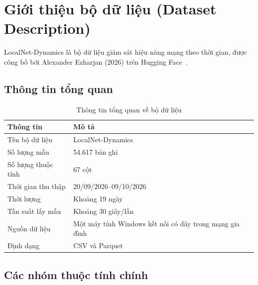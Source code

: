 \section{Giới thiệu bộ dữ liệu (Dataset Description)}

LocalNet-Dynamics là bộ dữ liệu giám sát hiệu năng mạng theo thời gian, được công bố bởi Alexander Ezharjan (2026) trên Hugging Face~\cite{localnet2026}.

\subsection{Thông tin tổng quan}

\begin{table}[H]
    \centering
    \caption{Thông tin tổng quan về bộ dữ liệu}
    \begin{tabular}{p{} p{}}
        \toprule
        \textbf{Thông tin} & \textbf{Mô tả} \\
        \midrule
        Tên bộ dữ liệu & LocalNet-Dynamics \\
        Số lượng mẫu & 54.617 bản ghi \\
        Số lượng thuộc tính & 67 cột \\
        Thời gian thu thập & 20/09/2026--09/10/2026 \\
        Thời lượng & Khoảng 19 ngày \\
        Tần suất lấy mẫu & Khoảng 30 giây/lần \\
        Nguồn dữ liệu &
        Một máy tính Windows kết nối có dây
        trong mạng gia đình \\
        Định dạng & CSV và Parquet \\
        \bottomrule
    \end{tabular}
\end{table}

\subsection{Các nhóm thuộc tính chính}


